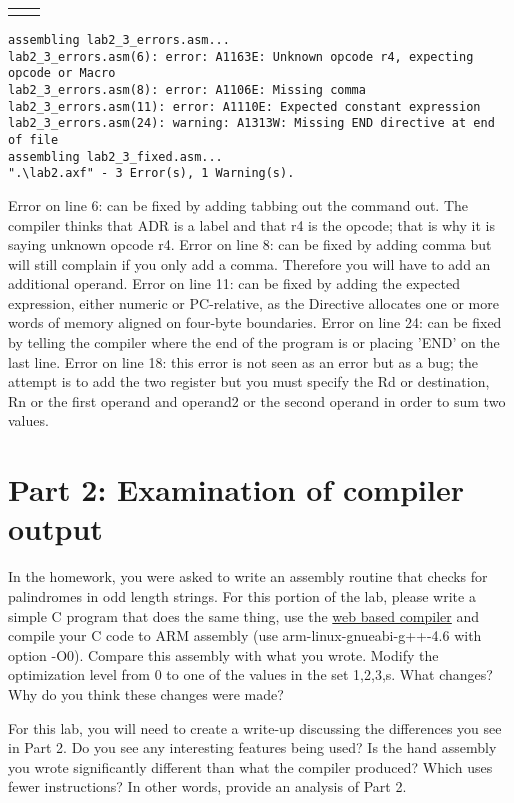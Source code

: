 \documentclass[letterpaper,12pt,titlepage]{article}
\begin{document}
\vspace{-0.75cm}
\begin{tabular}{p{7.5cm} p{7.5cm}}

&

\end{tabular}
\vspace{-0.75cm}
\begin{verbatim}
assembling lab2_3_errors.asm...
lab2_3_errors.asm(6): error: A1163E: Unknown opcode r4, expecting opcode or Macro
lab2_3_errors.asm(8): error: A1106E: Missing comma
lab2_3_errors.asm(11): error: A1110E: Expected constant expression
lab2_3_errors.asm(24): warning: A1313W: Missing END directive at end of file
assembling lab2_3_fixed.asm...
".\lab2.axf" - 3 Error(s), 1 Warning(s).
\end{verbatim}
Error on line 6: can be fixed by adding tabbing out the command out. The compiler thinks that ADR is a label and that r4 is the opcode; that is why it is saying unknown opcode r4.
Error on line 8: can be fixed by adding comma but will still complain if you only add a comma. Therefore you will have to add an additional operand.
Error on line 11: can be fixed by adding the expected expression, either numeric or PC-relative, as the Directive allocates one or more words of memory aligned on four-byte boundaries.
Error on line 24: can be fixed by telling the compiler where the end of the program is or placing 'END' on the last line. 
Error on line 18: this error is not seen as an error but as a bug; the attempt is to add the two register but you must specify the Rd or destination, Rn or the first operand and operand2 or the second operand in order to sum two values. 
\newpage
\section*{Part 2: Examination of compiler output}
In the homework, you were asked to write an assembly routine that checks for palindromes in odd length strings. For this portion of the lab, please write a simple C program that does the same thing, use the \href{http://gcc.godbolt.org}{web based compiler} and compile your  C code to ARM assembly (use arm-linux-gnueabi-g++-4.6 with option -O0). Compare this assembly with what you wrote. Modify the optimization level from 0 to one of the values in the set {1,2,3,s}. What changes? Why do you think these changes were made?

For this lab, you will need to create a write-up discussing the differences you see in Part 2. Do you see any interesting features being used? Is the hand assembly you wrote significantly different than what the compiler produced? Which uses fewer instructions? In other words, provide an analysis of Part 2.
\end{document}
